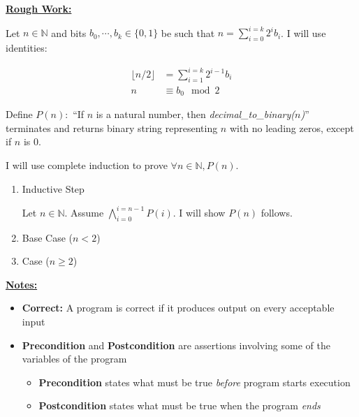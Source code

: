 \documentclass[12pt]{article}
\begin{document}
\begin{mdframed}
    \underline{\textbf{Rough Work:}}

    \bigskip

    Let $n \in \mathbb{N}$ and bits $b_0,\cdots,b_k \in \{0,1\}$ be such that
    $n = \sum\limits_{i = 0}^{i = k} 2^ib_i$. I will use identities:

    \begin{align}
        \lfloor n/2 \rfloor &= \sum\limits_{i=1}^{i=k} 2^{i-1}b_i\\
        n &\equiv b_0 \mod 2
    \end{align}

    \bigskip

    Define $P(n):$ ``If $n$ is a natural number, then \textit{decimal\_to\_binary($n$)}''
    terminates and returns binary string representing $n$ with no leading zeros,
    except if $n$ is 0.

    \bigskip

    I will use complete induction to prove $\forall n \in \mathbb{N}, P(n)$.

    \bigskip

    \begin{enumerate}[1.]
        \item Inductive Step
        \begin{mdframed}
        Let $n \in \mathbb{N}$. Assume $\bigwedge\limits_{i=0}^{i=n-1} P(i)$. I will
        show $P(n)$ follows.
        \end{mdframed}
        \item Base Case ($n < 2$)

        \begin{mdframed}

        \end{mdframed}

        \item Case ($n \geq 2$)
    \end{enumerate}
\end{mdframed}

\bigskip

\underline{\textbf{Notes:}}

\bigskip

\begin{itemize}
    \item \textbf{Correct:} A program is correct if it produces output on every acceptable input
    \item \textbf{Precondition} and \textbf{Postcondition} are assertions involving some of the variables of the program
    \begin{itemize}
        \item \textbf{Precondition} states what must be true \textit{before} program starts execution
        \item \textbf{Postcondition} states what must be true when the program \textit{ends}
    \end{itemize}
\end{itemize}
\end{document}
